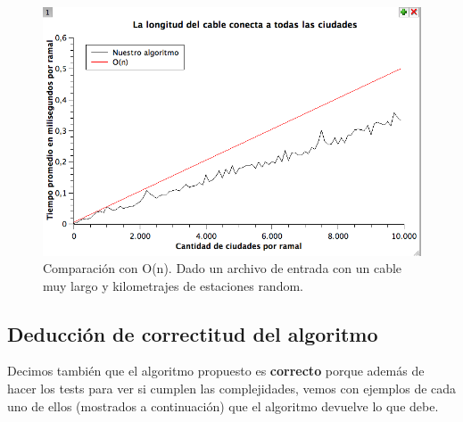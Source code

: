 \begin{figure}[H]
\begin{center}

  \includegraphics[width=\linewidth]{../graficos/ej1/CableLargo.png}
  \caption{{\small Comparación con O(n). Dado un archivo de entrada con un cable muy largo y kilometrajes de estaciones random.}} \label{ej1-tiempo-vs-cant-ciudades-random-long-cable-larga}
\endminipage

\end{center}
\end{figure}

\subsection{Deducción de correctitud del algoritmo}

Decimos también que el algoritmo propuesto es \textbf{correcto} porque además de hacer los tests para ver si cumplen las complejidades, vemos con ejemplos de cada uno de ellos (mostrados a continuación) que el algoritmo devuelve lo que debe.\\

